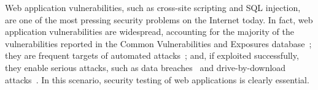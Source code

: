 
\def\currentprefix{johnny}













Web application vulnerabilities, such as cross-site scripting and SQL
injection, are one of the most pressing security problems on the
Internet today. In fact, web application vulnerabilities are widespread, accounting
for the majority of the vulnerabilities reported in the Common
Vulnerabilities and Exposures database~\cite{cve}; they are 
frequent targets of automated attacks~\cite{small08:predator}; and, if
exploited successfully, they enable serious attacks, such as data
breaches~\cite{datalossdb} and drive-by-download
attacks~\cite{provos08:iframes}. 
In this scenario, security testing of web applications is clearly
essential.  


